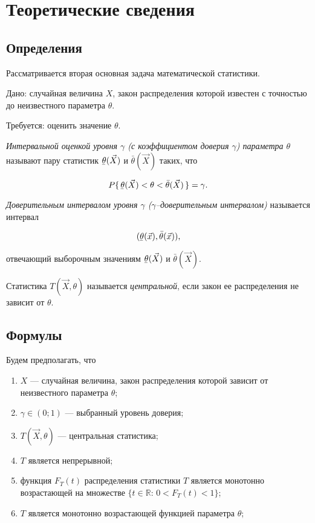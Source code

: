 \chapter{Теоретические сведения}

\section{Определения}

Рассматривается вторая основная задача математической статистики.

Дано: случайная величина $X$, закон распределения которой известен с точностью до неизвестного параметра $\theta$.

Требуется: оценить значение $\theta$.

\textit{Интервальной оценкой уровня $\gamma$ (с коэффициентом доверия $\gamma$) параметра $\theta$} называют пару статистик $\ubar{\theta}(\vec{X})$ и $\bar{\theta}(\vec{X})$ таких, что

\begin{equation}
	P\{ \, \ubar{\theta}(\vec{X}) < \theta < \bar{\theta}(\vec{X}) \, \} = \gamma.
\end{equation}

\textit{Доверительным интервалом уровня $\gamma$ ($\gamma$--доверительным интервалом)} называется интервал

\begin{equation}
	(\ubar{\theta}(\vec{x}), \bar{\theta}(\vec{x})),
\end{equation}

\noindent отвечающий выборочным значениям $\ubar{\theta}(\vec{X})$ и $\bar{\theta}(\vec{X})$.

Статистика $T(\vec{X}, \theta)$ называется \textit{центральной}, если закон ее распределения не зависит от $\theta$.

\section{Формулы}

Будем предполагать, что

\begin{enumerate}
	\item $X$ --- случайная величина, закон распределения которой зависит от неизвестного параметра $\theta$;
	\item $\gamma \in (0; 1)$ --- выбранный уровень доверия;
	\item $T(\vec{X}, \theta)$ --- центральная статистика;
	\item $T$ является непрерывной;
	\item функция $F_T(t)$ распределения статистики $T$ является монотонно возрастающей на множестве $\{t \in \mathbb{R}: \, 0 < F_T(t) < 1\}$;
	\item $T$ является монотонно возрастающей функцией параметра $\theta$;
\end{enumerate}

